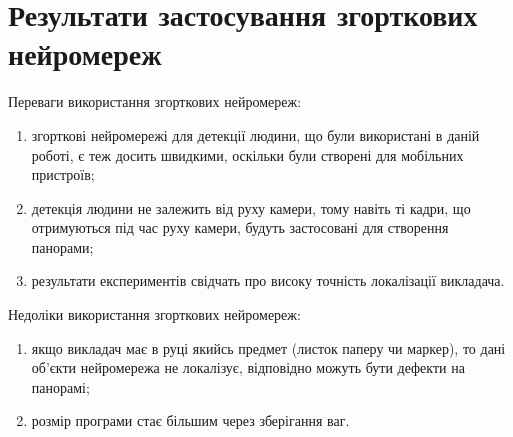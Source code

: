\section{Результати застосування згорткових нейромереж}

Переваги використання згорткових нейромереж:
\begin{enumerate}
    \item згорткові нейромережі для детекції людини, що були використані в даній роботі,
          є теж досить швидкими, оскільки були створені для мобільних пристроїв;
    \item детекція людини не залежить від руху камери, тому навіть ті кадри, що
          отримуються під час руху камери, будуть застосовані для створення панорами;
    \item результати експериментів свідчать про високу точність локалізації викладача.
\end{enumerate}

Недоліки використання згорткових нейромереж:
\begin{enumerate}
    \item якщо викладач має в руці якийсь предмет (листок паперу чи маркер), то дані
          об'єкти нейромережа не локалізує, відповідно можуть бути дефекти на панорамі;
    \item розмір програми стає більшим через зберігання ваг.
\end{enumerate}

